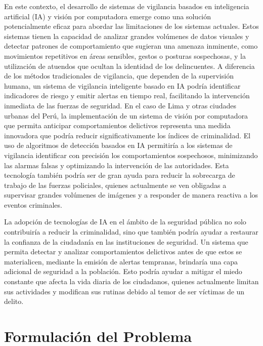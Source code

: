 \documentclass[listof=nochaptergap,12pt,times,authoryear]{report}
\begin{document}
En este contexto, el desarrollo de sistemas de vigilancia basados en inteligencia artificial (IA) y visión por computadora emerge como una solución potencialmente eficaz para abordar las limitaciones de los sistemas actuales. Estos sistemas tienen la capacidad de analizar grandes volúmenes de datos visuales y detectar patrones de comportamiento que sugieran una amenaza inminente, como movimientos repetitivos en áreas sensibles, gestos o posturas sospechosas, y la utilización de atuendos que ocultan la identidad de los delincuentes. A diferencia de los métodos tradicionales de vigilancia, que dependen de la supervisión humana, un sistema de vigilancia inteligente basado en IA podría identificar indicadores de riesgo y emitir alertas en tiempo real, facilitando la intervención inmediata de las fuerzas de seguridad.
En el caso de Lima y otras ciudades urbanas del Perú, la implementación de un sistema de visión por computadora que permita anticipar comportamientos delictivos representa una medida innovadora que podría reducir significativamente los índices de criminalidad. El uso de algoritmos de detección basados en IA permitiría a los sistemas de vigilancia identificar con precisión los comportamientos sospechosos, minimizando las alarmas falsas y optimizando la intervención de las autoridades. Esta tecnología también podría ser de gran ayuda para reducir la sobrecarga de trabajo de las fuerzas policiales, quienes actualmente se ven obligadas a supervisar grandes volúmenes de imágenes y a responder de manera reactiva a los eventos criminales.

La adopción de tecnologías de IA en el ámbito de la seguridad pública no solo contribuiría a reducir la criminalidad, sino que también podría ayudar a restaurar la confianza de la ciudadanía en las instituciones de seguridad. Un sistema que permita detectar y analizar comportamientos delictivos antes de que estos se materialicen, mediante la emisión de alertas tempranas, brindaría una capa adicional de seguridad a la población. Esto podría ayudar a mitigar el miedo constante que afecta la vida diaria de los ciudadanos, quienes actualmente limitan sus actividades y modifican sus rutinas debido al temor de ser víctimas de un delito.





\chapter{Formulación del Problema}
\end{document}
